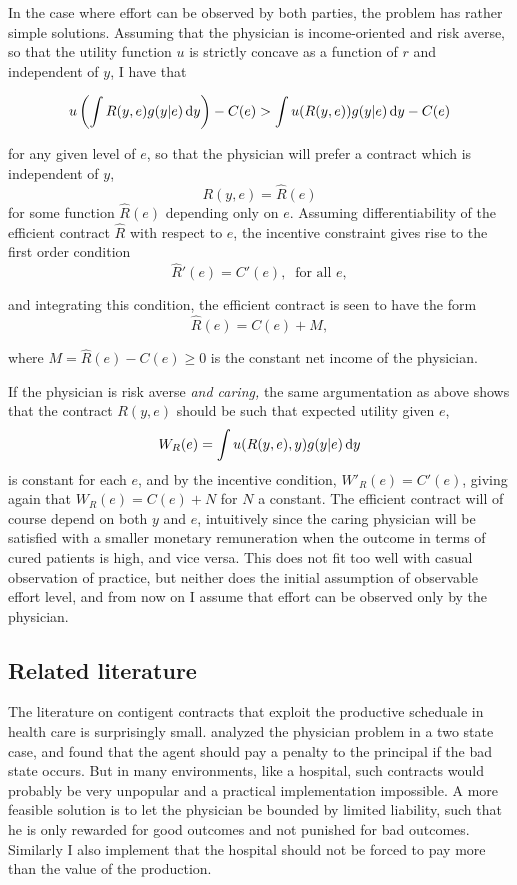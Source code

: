 In the case where effort can be observed by both parties, the problem has rather simple solutions. Assuming that the physician is income-oriented and risk averse, so that the utility function $u$ is strictly concave as a function of $r$ and independent of $y$, I have that

\[
	u\left(\int R(y,e)g(y|e)\dif y\right)-C(e)>\int u(R(y,e))g(y|e)\dif y-C(e)
\]

for any given level of $e$, so that the physician will prefer a contract which is independent of $y$,
\[
	R(y,e)=\hat{R}(e)
\]
for some function $\hat{R}(e)$ depending only on $e$. Assuming differentiability of the efficient contract $\hat{R}$ with respect to $e$, the incentive constraint
gives rise to the first order condition
\[
	\hat{R}'(e)= C'(e),\ \text{ for all } e,
\]

and  integrating this condition, the efficient contract is seen to have the form
\[
	\hat{R}(e)=C(e)+M,
\]

where $M=\hat{R}(e)-C(e)\geq 0$ is the constant net income of the physician.

If the physician is risk averse \emph{and caring,} the same argumentation as above shows that the contract $R(y,e)$ should be such that expected utility given $e$, 
\[
	W_R(e)=\int u(R(y,e),y)g(y|e)\dif y
\]
is constant for each $e$, and by the incentive condition,
$W'_R(e)=C'(e)$, giving again that $W_R(e)=C(e)+N$ for $N$ a constant. The efficient contract will of course depend on both $y$ and $e$, intuitively since the caring physician will be satisfied with a smaller monetary remuneration when the outcome in terms of cured patients is high, and vice versa. This does not fit too well with casual observation of practice, but neither does the initial assumption of observable effort level, and from now on I assume that effort can be observed only by the physician.


\subsection{Related literature} %
\label{sub:related_litterature}
The literature on contigent contracts that exploit the productive scheduale in health care is surprisingly small. \textcite{Schoonbeek2005No} analyzed the physician problem in a two state case, and found that the agent should pay a penalty to the principal if the bad state occurs. But in many environments, like a hospital, such contracts would probably be very unpopular and a practical implementation impossible. A more feasible solution is to let the physician be bounded by limited liability, such that he is only rewarded for good outcomes and not punished for bad outcomes. Similarly I also implement that the hospital should not be forced to pay more than the value of the production.  

